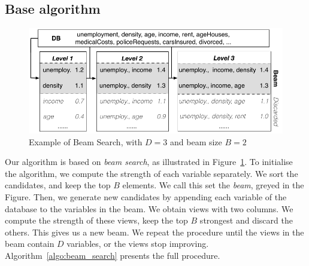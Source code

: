 \subsection{Base algorithm}
\label{sec:base}
\begin{figure}[t!]
\centering
\includegraphics[width=\columnwidth]{images/beam-search}
\caption{Example of Beam Search, with $D=3$ and beam size $B=2$}
\label{pic:beam-search}
\end{figure}
Our algorithm is based on \emph{beam search}, as illustrated in
Figure~\ref{pic:beam-search}.  To initialise the algorithm, we compute the
strength of each variable separately. We sort the candidates, and keep the top
$B$ elements. We call this set the \emph{beam}, greyed in the Figure. Then, we
generate new candidates by appending each variable of the database to the
variables in the beam. We obtain views with two columns.  We compute the
strength of these views, keep the top $B$ strongest and discard the others.
This gives us a new beam. We repeat the procedure until the views in the beam
contain $D$ variables, or the views stop improving.
Algorithm~\ref{algo:beam_search} presents the full procedure.

